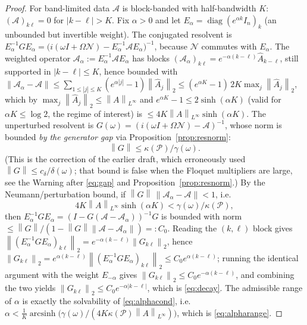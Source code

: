 \documentclass{amsart}
\theoremstyle{definition}
\DeclareMathOperator{\diag}{diag}
\newcommand{\norm}[1]{\left\lVert#1\right\rVert}
\newcommand{\Acal}{\mathcal{A}}
\newcommand{\Ncal}{\mathcal{N}}
\begin{document}
\begin{proof}
For band-limited data $\Acal$ is block-banded with half-bandwidth $K$:
$(\Acal)_{k\ell}=0$ for $|k-\ell|>K$. Fix $\alpha>0$ and let
$E_\alpha=\diag(e^{\alpha k}I_n)_{k}$ (an unbounded but invertible weight). The
conjugated resolvent is
$E_\alpha^{-1}G E_\alpha=\big(i(\omega I+\Omega\Ncal)-E_\alpha^{-1}\Acal E_\alpha\big)^{-1}$,
because $\Ncal$ commutes with $E_\alpha$. The weighted operator
$\Acal_\alpha:=E_\alpha^{-1}\Acal E_\alpha$ has blocks
$(\Acal_\alpha)_{k\ell}=e^{-\alpha(k-\ell)}\hat A_{k-\ell}$, still supported in
$|k-\ell|\le K$, hence bounded with
$\norm{\Acal_\alpha-\Acal}\le \sum_{1\le|j|\le K}(e^{\alpha|j|}-1)\norm{\hat A_j}_2
\le (e^{\alpha K}-1)\,2K\max_j\norm{\hat A_j}_2$, which by
$\max_j\norm{\hat A_j}_2\le\norm{A}_{L^\infty}$ and $e^{\alpha K}-1\le
2\sinh(\alpha K)$ (valid for $\alpha K\le\log 2$, the regime of interest) is
$\le 4K\norm{A}_{L^\infty}\sinh(\alpha K)$. The unperturbed
resolvent is $G(\omega)=(i(\omega I+\Omega\Ncal)-\Acal)^{-1}$, whose norm is
bounded \emph{by the generator gap} via Proposition~\ref{prop:resnorm}:
\[
\norm{G}\le \kappa(\mathcal P)/\gamma(\omega).
\]
(This is the correction of the earlier draft, which erroneously used
$\norm{G}\le c_\delta/\delta(\omega)$; that bound is false when the Floquet
multipliers are large, see the Warning after \eqref{eq:gap} and
Proposition~\ref{prop:resnorm}.) By the
Neumann/perturbation bound, if
$\norm{G}\,\norm{\Acal_\alpha-\Acal}<1$, i.e.
\begin{equation}\label{eq:alphacond}
4K\norm{A}_{L^\infty}\sinh(\alpha K)<\gamma(\omega)/\kappa(\mathcal P),
\end{equation}
then $E_\alpha^{-1}GE_\alpha=(I-G(\Acal-\Acal_\alpha))^{-1}G$ is bounded with norm
$\le \norm{G}/(1-\norm{G}\norm{\Acal-\Acal_\alpha})=:C_0$. Reading the
$(k,\ell)$ block gives
$\norm{(E_\alpha^{-1}GE_\alpha)_{k\ell}}_2=e^{-\alpha(k-\ell)}\norm{G_{k\ell}}_2$,
hence $\norm{G_{k\ell}}_2=e^{\alpha(k-\ell)}\norm{(E_\alpha^{-1}GE_\alpha)_{k\ell}}_2
\le C_0 e^{\alpha(k-\ell)}$; running the identical argument with the weight
$E_{-\alpha}$ gives $\norm{G_{k\ell}}_2\le C_0 e^{-\alpha(k-\ell)}$, and
combining the two yields $\norm{G_{k\ell}}_2\le C_0 e^{-\alpha|k-\ell|}$, which is
\eqref{eq:decay}. The admissible range of $\alpha$ is exactly the solvability of
\eqref{eq:alphacond}, i.e.
$\alpha<\tfrac1K\operatorname{arcsinh}\!\big(\gamma(\omega)/(4K\kappa(\mathcal P)\norm{A}_{L^\infty})\big)$,
which is \eqref{eq:alpharange}.
\end{proof}
\end{document}
